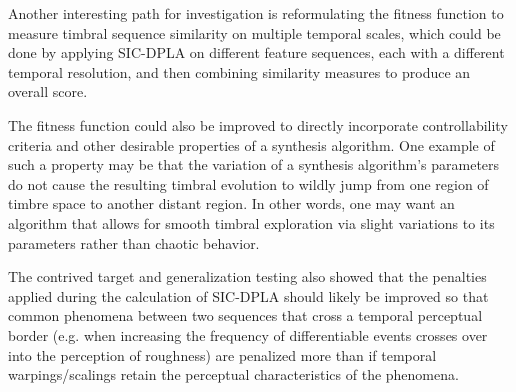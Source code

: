 \documentclass[12pt]{report} 	%
\numberwithin{figure}{chapter}
\numberwithin{table}{chapter}
\numberwithin{equation}{chapter}
\begin{document}
\begin{flushleft}
Another interesting path for investigation is reformulating the fitness function to measure timbral sequence similarity on multiple temporal scales, which could be done by applying SIC-DPLA on different feature sequences, each with a different temporal resolution, and then combining similarity measures to produce an overall score.

The fitness function could also be improved to directly incorporate controllability criteria and other desirable properties of a synthesis algorithm. One example of such a property may be that the variation of a synthesis algorithm's parameters do not cause the resulting timbral evolution to wildly jump from one region of timbre space to another distant region. In other words, one may want an algorithm that allows for smooth timbral exploration via slight variations to its parameters rather than chaotic behavior.

The contrived target and generalization testing also showed that the penalties applied during the calculation of SIC-DPLA should likely be improved so that common phenomena between two sequences that cross a temporal perceptual border (e.g. when increasing the frequency of differentiable events crosses over into the perception of roughness) are penalized more than if temporal warpings/scalings retain the perceptual characteristics of the phenomena.

\renewcommand\bibname{BIBLIOGRAPHY}
\linespread{1}					%
\newpage
\nocite{*}	%
\setlength{}
\end{flushleft}
\end{document}
